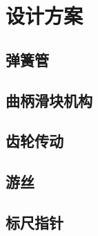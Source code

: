 \section{设计方案}

\subsection{弹簧管}

\subsection{曲柄滑块机构}

\subsection{齿轮传动}

\subsection{游丝}

\subsection{标尺指针}
